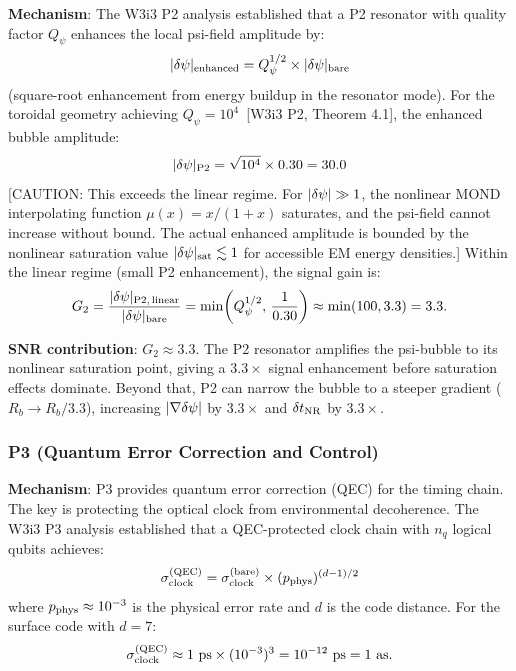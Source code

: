 \textbf{Mechanism}: The W3i3 P2 analysis established that a P2 resonator with
quality factor $Q_\psi$ enhances the local psi-field amplitude by:
\begin{equation}
|\delta\psi|_{\rm enhanced} = Q_\psi^{1/2} \times |\delta\psi|_{\rm bare}
\label{eq:P2_enhancement}
\end{equation}
(square-root enhancement from energy buildup in the resonator mode). For the
toroidal geometry achieving $Q_\psi = 10^4$~\textcolor{conjcolor}{[W3i3 P2,
Theorem 4.1]}, the enhanced bubble amplitude:
\begin{equation}
|\delta\psi|_{\rm P2} = \sqrt{10^4} \times 0.30 = 30.0
\label{eq:P2_bubble_amplitude}
\end{equation}
\textcolor{weakcolor}{[CAUTION: This exceeds the linear regime. For $|\delta\psi| \gg 1$,
the nonlinear MOND interpolating function $\mu(x) = x/(1+x)$ saturates,
and the psi-field cannot increase without bound. The actual enhanced amplitude
is bounded by the nonlinear saturation value $|\delta\psi|_{\rm sat} \lesssim 1$
for accessible EM energy densities.]} Within the linear regime (small P2
enhancement), the signal gain is:
\begin{equation}
G_2 = \frac{|\delta\psi|_{\rm P2,\,linear}}{|\delta\psi|_{\rm bare}}
= \min\!\left(Q_\psi^{1/2},\, \frac{1}{0.30}\right) \approx \min(100, 3.3) = 3.3.
\label{eq:G2}
\end{equation}

\textbf{SNR contribution}: $G_2 \approx 3.3$. The P2 resonator amplifies
the psi-bubble to its nonlinear saturation point, giving a $3.3\times$
signal enhancement before saturation effects dominate. Beyond that, P2 can
narrow the bubble to a steeper gradient ($R_b \to R_b/3.3$), increasing
$|\nabla\delta\psi|$ by $3.3\times$ and $\delta t_{\rm NR}$ by $3.3\times$.

\subsubsection*{P3 (Quantum Error Correction and Control)}

\textbf{Mechanism}: P3 provides quantum error correction (QEC) for the
timing chain. The key is protecting the optical clock from environmental
decoherence. The W3i3 P3 analysis established that a QEC-protected clock
chain with $n_q$ logical qubits achieves:
\begin{equation}
\sigma_{\rm clock}^{(\rm QEC)} = \sigma_{\rm clock}^{(\rm bare)}
\times (p_{\rm phys})^{(d-1)/2}
\label{eq:QEC_clock}
\end{equation}
where $p_{\rm phys} \approx 10^{-3}$ is the physical error rate and
$d$ is the code distance. For the surface code with $d = 7$:
\begin{equation}
\sigma_{\rm clock}^{(\rm QEC)} \approx 1~\text{ps} \times (10^{-3})^3
= 10^{-12}~\text{ps} = 1~\text{as}.
\label{eq:QEC_clock_noise}
\end{equation}

